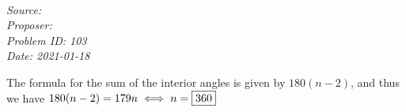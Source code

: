 \SSbreak\\
\emph{Source: \Cfolk}\\
\emph{Proposer: \Pss}\\
\emph{Problem ID: 103}\\
\emph{Date: 2021-01-18}\\
\SSbreak

\bigskip

\begin{solution}\hfil\medskip
  
  The formula for the sum of the interior angles is given by \(180(n-2)\), and thus we have \(180(n-2)=179n\iff n=\fbox{360} \)
\end{solution}\bigskip
